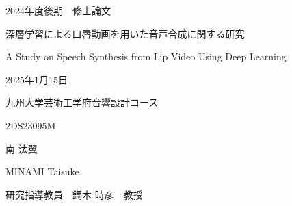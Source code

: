 \documentclass[12pt]{jarticle}
\numberwithin{equation}{section}    %
\numberwithin{figure}{section}      %
\numberwithin{table}{section}      %
\begin{document}
\begin{titlepage}
    \begin{center}
        {\Large 2024年度後期　修士論文}
        \vspace{120truept}

        {\huge 深層学習による口唇動画を用いた音声合成に関する研究}
        \vspace{30truept}

        {\huge A Study on Speech Synthesis from Lip Video Using Deep Learning}
        \vspace{120truept}

        {\Large 2025年1月15日}
        \vspace{10truept}

        {\Large 九州大学芸術工学府音響設計コース}
        \vspace{70truept}

        {\Large 2DS23095M}
        \vspace{10truept}

        {\Large 南 汰翼}
        \vspace{10truept}

        {\Large MINAMI Taisuke}
        \vspace{30truept}

        {\Large 研究指導教員　鏑木 時彦　教授}
    \end{center}
\end{titlepage}
\end{document}
